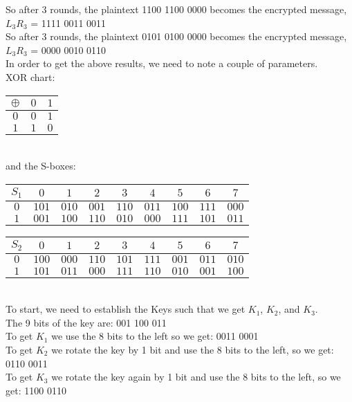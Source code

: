 \documentclass[12pt,letterpaper,final]{report}
\begin{document}
\bigskip
So after 3 rounds, the plaintext 1100 1100 0000 becomes the encrypted message, $L_3R_3$ = 1111 0011 0011 \\
So after 3 rounds, the plaintext 0101 0100 0000 becomes the encrypted message, $L_3R_3$ = 0000 0010 0110 \\

\bigskip In order to get the above results, we need to note a couple of parameters.  \\
XOR chart:  
\indent\begin{tabular}{|c|c c|}
\hline
$ \oplus $ & $ 0 $ & $ 1 $ \\
\hline
$ 0 $ &  $ 0 $ & $ 1 $ \\
$ 1 $ & $ 1 $ & $ 0 $ \\
\hline
\end{tabular} \\

and the S-boxes: \\

\begin{tabular}{|c| c c c c c c c c|}
\hline
$ S_1 $ & $ 0 $ & $ 1 $ & $ 2 $ & $ 3 $ & $ 4 $ & $ 5 $ & $ 6 $ & $ 7 $ \\
\hline
$ 0 $ & $ 101 $ & $ 010 $ & $ 001 $ & $ 110 $ & $ 011 $ & $ 100 $ & $ 111 $ & $ 000 $ \\
$ 1 $ & $ 001 $ & $ 100 $ & $ 110 $ & $ 010 $ & $ 000 $ & $ 111 $ & $ 101 $ & $ 011 $ \\
\hline 
\end{tabular} \bigskip

\begin{tabular}{|c| c c c c c c c c|}
\hline
$ S_2 $ & $ 0 $ & $ 1 $ & $ 2 $ & $ 3 $ & $ 4 $ & $ 5 $ & $ 6 $ & $ 7 $ \\
\hline
$ 0 $ & $ 100 $ & $ 000 $ & $ 110 $ & $ 101 $ & $ 111 $ & $ 001 $ & $ 011 $ & $ 010 $ \\
$ 1 $ & $ 101 $ & $ 011 $ & $ 000 $ & $ 111 $ & $ 110 $ & $ 010 $ & $ 001 $ & $ 100 $ \\
\hline
\end{tabular} \\



\bigskip To start, we need to establish the Keys such that we get $K_1$, $K_2$, and $K_3$. \\
\indent The 9 bits of the key are: 001 100 011 \\
\indent To get $K_1$ we use the 8 bits to the left so we get: 0011 0001 \\
\indent To get $K_2$ we rotate the key by 1 bit and use the 8 bits to the left, so we get: 0110 0011 \\
\indent To get $K_3$ we rotate the key again by 1 bit and use the 8 bits to the left, so we get: 1100 0110 \\
\end{document}

